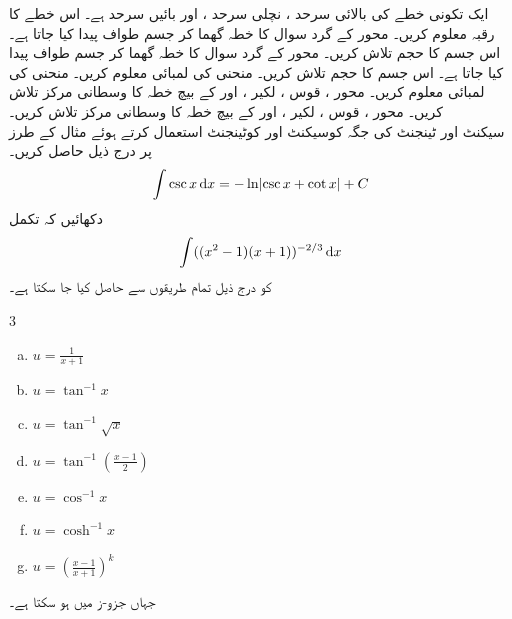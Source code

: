 ایک تکونی خطے کی بالائی سرحد ، نچلی سرحد  ، اور بائیں سرحد  ہے۔ اس خطے کا رقبہ معلوم کریں۔
محور  کے گرد سوال  کا خطہ گھما کر جسم طواف پیدا کیا جاتا ہے۔ اس جسم کا حجم تلاش کریں۔
محور  کے گرد سوال  کا خطہ گھما کر جسم طواف پیدا کیا جاتا ہے۔ اس جسم کا حجم تلاش کریں۔
منحنی  کی لمبائی معلوم کریں۔
منحنی  کی لمبائی معلوم کریں۔
محور ، قوس ، لکیر ،  اور  کے بیچ خطہ کا وسطانی مرکز تلاش کریں۔
محور ، قوس ، لکیر  ، اور  کے بیچ خطہ کا وسطانی مرکز تلاش کریں۔
\\
سیکنٹ اور ٹینجنٹ کی جگہ کوسیکنٹ اور کوٹینجنٹ استعمال کرتے ہوئے مثال  کے طرز پر درج ذیل حاصل کریں۔
\begin{align*}
\int\csc x\dif x=-\ln\abs{\csc x+\cot x}+C
\end{align*}
دکھائیں کہ تکمل
\begin{align*}
\int((x^2-1)(x+1))^{-2/3}\dif x
\end{align*}
کو درج ذیل تمام طریقوں سے حاصل کیا جا سکتا ہے۔
\begin{multicols}{3}
\begin{enumerate}[a.]
\item
$u=\tfrac{1}{x+1}$
\item
$u=\tan^{-1}x$
\item
$u=\tan^{-1}\sqrt{x}$
\item
$u=\tan^{-1}(\tfrac{x-1}{2})$
\item
$u=\cos^{-1}x$
\item
$u=\cosh^{-1}x$
\item
$u=(\tfrac{x-1}{x+1})^k$
\end{enumerate}
\end{multicols}
جہاں جزو-ز میں  ہو سکتا ہے۔

